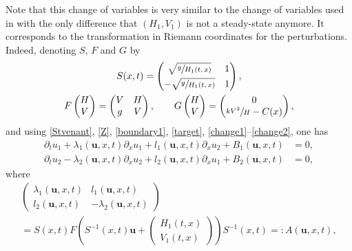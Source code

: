 Note that this change of variables is very similar to the change of variables used in \hbox{\cite{BastinCoron22,HS}} with the only difference that $(H_{1},V_{1})$ is not a steady-state anymore.
It corresponds to the transformation in Riemann coordinates for the perturbations.
Indeed, denoting $S$, $F$ and $G$ by
\begin{gather}
S(x,t)=\begin{pmatrix}\sqrt{\sfrac{g}{H_{1}(t,x)}} & 1\\[3pt]
-\sqrt{\sfrac{g}{H_{1}(t,x)}} & 1\end{pmatrix},
\label{defS}\\
F\begin{pmatrix}H\\V\end{pmatrix}=\begin{pmatrix}
V & H\\
g & V
\end{pmatrix},
\label{defF}\qquad
G\begin{pmatrix}H\\V\end{pmatrix}=\begin{pmatrix}0\\\sfrac{kV^{2}}{H}-C(x)\end{pmatrix},
\end{gather}
and using \eqref{Stvenant}, \eqref{Z}, \eqref{boundary1}, \eqref{target}, \eqref{change1}--\eqref{change2}, one has
\begin{equation}
\label{sys1}
\begin{split}
\partial_{t}u_{1}+\lambda_{1}(\boldsymbol{u},x,t)\partial_{x}u_{1}+l_{1}(\boldsymbol{u},x,t)\partial_{x}u_{2}+B_{1}(\boldsymbol{u},x,t)&=0,\\
\partial_{t}{u_{2}}-\lambda_{2}(\boldsymbol{u},x,t)\partial_{x}u_{2}+l_{2}(\boldsymbol{u},x,t)\partial_{x}u_{1}+B_{2}(\boldsymbol{u},x,t)&=0,
\end{split}
\end{equation}
where\vspace*{-5pt}
\begin{multline}
\label{defA}
\begin{pmatrix}\lambda_{1}(\boldsymbol{u},x,t) & l_{1}(\boldsymbol{u},x,t)\\l_{2}(\boldsymbol{u},x,t) & -\lambda_{2}(\boldsymbol{u},x,t)\end{pmatrix}\\[-5pt]
=S(x,t)F\left(S^{-1}(x,t)\boldsymbol{u}+\begin{pmatrix}H_{1}(t,x)\\V_{1}(t,x)\end{pmatrix}\right)S^{-1}(x,t)=:A(\boldsymbol{u},x,t),
\end{multline}
